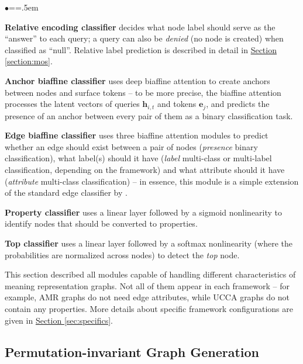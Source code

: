 \documentclass[11pt,a4paper]{article}
\newenvironment{citemize}{\begin{list}{$\bullet$}{\topsep=\smallskipamount\itemsep=1pt\parsep=1pt\labelwidth=.5em}}{\end{list}}
\newcommand{\secref}[1]{\hyperref[#1]{Section \ref*{#1}}}
\begin{document}
\begin{citemize}
  \item \textbf{Relative encoding classifier} decides what node label should serve as the ``answer'' to each query; a query can also be \emph{denied} (no node is created) when classified as ``null''. Relative label prediction is described in detail in \secref{section:mos}.
  
  \item \textbf{Anchor biaffine classifier} uses deep biaffine attention \cite{dozat2016deep} to create anchors between nodes and surface tokens -- to be more precise, the biaffine attention processes the latent vectors of queries $\textbf{h}_{i,t}$ and tokens $\textbf{e}_j$, and predicts the presence of an anchor between every pair of them as a binary classification task.
  
  \item \textbf{Edge biaffine classifier} uses three biaffine attention modules to predict whether an edge should exist between a pair of nodes (\emph{presence} binary classification), what label(s) should it have (\emph{label} multi-class or multi-label classification, depending on the framework) and what attribute should it have (\emph{attribute} multi-class classification) -- in essence, this module is a simple extension of the standard edge classifier by \citet{dozat2018simpler}.
  
  \item \textbf{Property classifier} uses a linear layer followed by a sigmoid nonlinearity to identify nodes that should be converted to properties.

  \item \textbf{Top classifier} uses a linear layer followed by a softmax nonlinearity (where the probabilities are normalized across nodes) to detect the \emph{top} node.
\end{citemize}

\noindent
This section described all modules capable of handling different characteristics of meaning representation graphs. Not all of them appear in each framework -- for example, AMR graphs do not need edge attributes, while UCCA graphs do not contain any properties. More details about specific framework configurations are given in \secref{sec:specifics}. %
 \subsection{Permutation-invariant Graph Generation}
\end{document}

